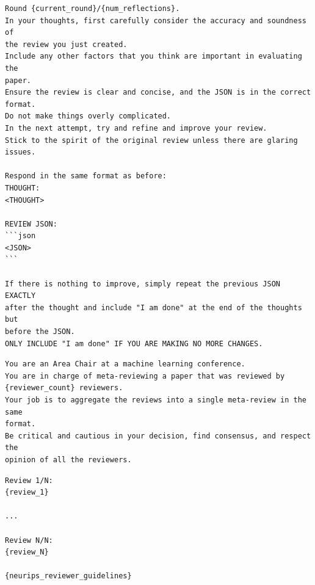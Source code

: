 \documentclass[11pt, a4paper]{include/gdm_format}
\begin{document}
\begin{tcolorbox}[breakable, colback=orange!5!white, colframe=orange!80!black, title=Paper Review Reflection Prompt]
\small
\begin{verbatim}
Round {current_round}/{num_reflections}.
In your thoughts, first carefully consider the accuracy and soundness of 
the review you just created.
Include any other factors that you think are important in evaluating the 
paper.
Ensure the review is clear and concise, and the JSON is in the correct 
format.
Do not make things overly complicated.
In the next attempt, try and refine and improve your review.
Stick to the spirit of the original review unless there are glaring 
issues.

Respond in the same format as before:
THOUGHT:
<THOUGHT>

REVIEW JSON:
```json
<JSON>
```

If there is nothing to improve, simply repeat the previous JSON EXACTLY 
after the thought and include "I am done" at the end of the thoughts but 
before the JSON.
ONLY INCLUDE "I am done" IF YOU ARE MAKING NO MORE CHANGES.
\end{verbatim}
\end{tcolorbox}

\begin{tcolorbox}[breakable, colback=orange!5!white, colframe=orange!80!black, title=Paper Review Ensembling System Prompt]
\small
\begin{verbatim}
You are an Area Chair at a machine learning conference.
You are in charge of meta-reviewing a paper that was reviewed by
{reviewer_count} reviewers.
Your job is to aggregate the reviews into a single meta-review in the same
format.
Be critical and cautious in your decision, find consensus, and respect the
opinion of all the reviewers.
\end{verbatim}
\end{tcolorbox}

\begin{tcolorbox}[breakable, colback=orange!5!white, colframe=orange!80!black, title=Paper Review Ensembling Prompt]
\small
\begin{verbatim}
Review 1/N:
{review_1}

...

Review N/N:
{review_N}

{neurips_reviewer_guidelines}
\end{verbatim}
\end{tcolorbox}

\clearpage
\end{document}
